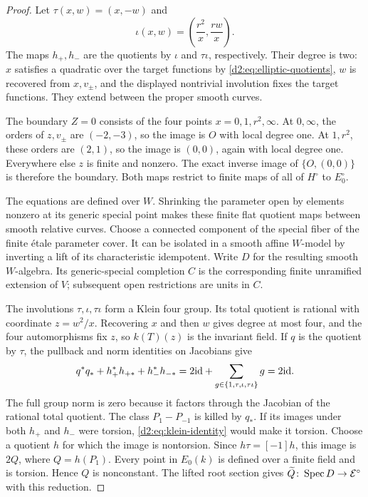 \begin{proof}
Let \(\tau(x,w)=(x,-w)\) and
\[
 \iota(x,w)=\left(\frac{r^2}{x},\frac{rw}{x}\right).
\]
The maps \(h_+,h_-\) are the quotients by \(\iota\) and
\(\tau\iota\), respectively.
Their degree is two: \(x\) satisfies a quadratic over the target
functions by \eqref{d2:eq:elliptic-quotients}, \(w\) is recovered from
\(x,v_\pm\), and the displayed nontrivial involution fixes the
target functions.
They extend between the proper smooth curves.

The boundary \(Z=0\) consists of the four points
\(x=0,1,r^2,\infty\).
At \(0,\infty\), the orders of \(z,v_\pm\) are \((-2,-3)\), so
the image is \(O\) with local degree one.
At \(1,r^2\), these orders are \((2,1)\), so the image is
\((0,0)\), again with local degree one.
Everywhere else \(z\) is finite and nonzero.
The exact inverse image of \(\{O,(0,0)\}\) is therefore the boundary.
Both maps restrict to finite maps of all of \(H^\circ\) to
\(E_0^\circ\).

The equations are defined over \(W\).
Shrinking the parameter open by elements nonzero at its generic
special point makes these finite flat quotient maps between smooth
relative curves.
Choose a connected component of the special fiber of the finite
\'etale parameter cover.
It can be isolated in a smooth affine \(W\)-model by inverting a
lift of its characteristic idempotent.
Write \(D\) for the resulting smooth \(W\)-algebra.
Its generic-special completion \(C\) is the corresponding finite
unramified extension of \(V\); subsequent open restrictions are
units in \(C\).

The involutions \(\tau,\iota,\tau\iota\) form a Klein four group.
Its total quotient is rational with coordinate \(z=w^2/x\).
Recovering \(x\) and then \(w\) gives degree at most four, and the
four automorphisms fix \(z\), so \(k(T)(z)\) is the invariant field.
If \(q\) is the quotient by \(\tau\), the pullback and norm identities
on Jacobians give
\begin{equation}\label{d2:eq:klein-identity}
 q^*q_*+h_+^*h_{+*}+h_-^*h_{-*}
   =2\mathrm{id}+\sum_{g\in\{1,\tau,\iota,\tau\iota\}}g
   =2\mathrm{id}.
\end{equation}
The full group norm is zero because it factors through the Jacobian
of the rational total quotient.
The class \(P_1-P_{-1}\) is killed by \(q_*\).
If its images under both \(h_+\) and \(h_-\) were torsion,
\eqref{d2:eq:klein-identity} would make it torsion.
Choose a quotient \(h\) for which the image is nontorsion.
Since \(h\tau=[-1]h\), this image is \(2Q\), where \(Q=h(P_1)\).
Every point in \(E_0(k)\) is defined over a finite field and is
torsion. Hence \(Q\) is nonconstant.
The lifted root section gives
\(\widetilde Q\colon\operatorname{Spec} D\to\mathcal E^\circ\) with this reduction.


\end{proof}
